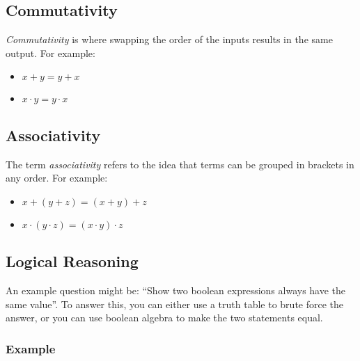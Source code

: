 \subsection{Commutativity}\label{sub:commutativity}

\emph{Commutativity} is where swapping the order of the inputs results in the same output.
For example:

\begin{itemize}
	\item \(x+y=y+x\)
	\item \(x \cdot y = y \cdot x\)
\end{itemize}

\subsection{Associativity}\label{sub:associativity}

The term \emph{associativity} refers to the idea that terms can be grouped in brackets in any order.
For example:

\begin{itemize}
	\item \(x + (y + z) = (x + y) + z\)
	\item \(x \cdot (y \cdot z) = (x \cdot y) \cdot z\)
\end{itemize}

\subsection{Logical Reasoning}\label{sub:logical_reasoning}

An example question might be: ``Show two boolean expressions always have the same value''.
To answer this, you can either use a truth table to brute force the answer, or you can use boolean algebra to make the two statements equal.

\subsubsection{Example}\label{ssub:example}

